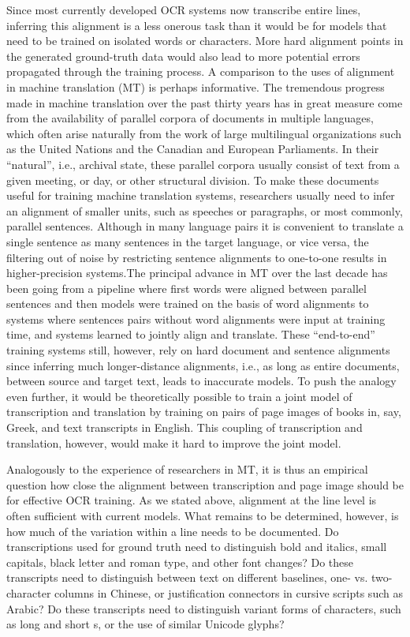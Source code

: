 \documentclass[twoside,11pt]{report}
\begin{document}
Since most currently developed OCR systems now transcribe entire lines, inferring this alignment is a less onerous task than it would be for models that need to be trained on isolated words or characters. More hard alignment points in the generated ground-truth data would also lead to more potential errors propagated through the training process. A comparison to the uses of alignment in machine translation (MT) is perhaps informative. The tremendous progress made in machine translation over the past thirty years has in great measure come from the availability of parallel corpora of documents in multiple languages, which often arise naturally from the work of large multilingual organizations such as the United Nations and the Canadian and European Parliaments. In their ``natural'', i.e., archival state, these parallel corpora usually consist of text from a given meeting, or day, or other structural division. To make these documents useful for training machine translation systems, researchers usually need to infer an alignment of smaller units, such as speeches or paragraphs, or most commonly, parallel sentences. Although in many language pairs it is convenient to translate a single sentence as many sentences in the target language, or vice versa, the filtering out of noise by restricting sentence alignments to one-to-one results in higher-precision systems.The principal advance in MT over the last decade has been going from a pipeline where first words were aligned between parallel sentences and then models were trained on the basis of word alignments to systems where sentences pairs without word alignments were input at training time, and systems learned to jointly align and translate. These ``end-to-end'' training systems still, however, rely on hard document and sentence alignments since inferring much longer-distance alignments, i.e., as long as entire documents, between source and target text, leads to inaccurate models. To push the analogy even further, it would be theoretically possible to train a joint model of transcription and translation by training on pairs of page images of books in, say, Greek, and text transcripts in English. This coupling of transcription and translation, however, would make it hard to improve the joint model.

Analogously to the experience of researchers in MT, it is thus an empirical question how close the alignment between transcription and page image should be for effective OCR training. As we stated above, alignment at the line level is often sufficient with current models. What remains to be determined, however, is how much of the variation within a line needs to be documented. Do transcriptions used for ground truth need to distinguish bold and italics, small capitals, black letter and roman type, and other font changes? Do these transcripts need to distinguish between text on different baselines, one- vs. two-character columns in Chinese, or justification connectors in cursive scripts such as Arabic? Do these transcripts need to distinguish variant forms of characters, such as long and short s, or the use of similar Unicode glyphs?
\end{document}
